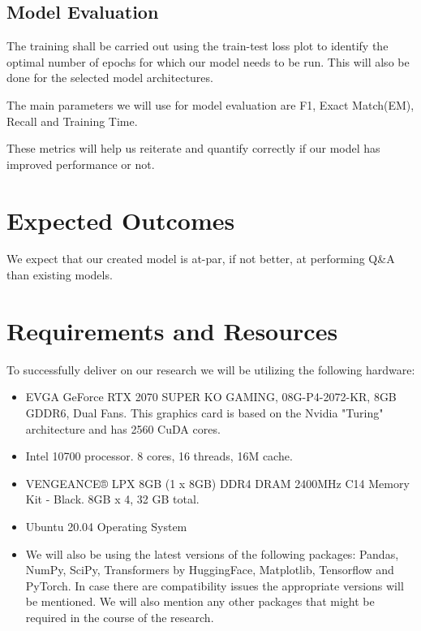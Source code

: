 \documentclass[12pt]{report}
\begin{document}
\begin{appendices}
        \subsection{Model Evaluation}
        The training shall be carried out using the train-test loss plot to identify the optimal number of epochs for which our model needs to be run. This will also be done for the selected model architectures.

        The main parameters we will use for model evaluation are F1, Exact Match(EM), Recall and Training Time.

        These metrics will help us reiterate and quantify correctly if our model has improved performance or not.

        \section{Expected Outcomes}\label{expectedoutcomes}

        We expect that our created model is at-par, if not better, at performing Q\&A than existing models.
        \section{Requirements and Resources}\label{resources}

        To successfully deliver on our research we will be utilizing the following hardware:
        \begin{itemize}
            \item EVGA GeForce RTX 2070 SUPER KO GAMING, 08G-P4-2072-KR, 8GB GDDR6, Dual Fans\citep{evga}. This graphics card is based on the Nvidia "Turing" architecture and has 2560 CuDA cores.
            \item Intel 10700 processor. 8 cores, 16 threads, 16M cache\citep{intel}.
            \item VENGEANCE® LPX 8GB (1 x 8GB) DDR4 DRAM 2400MHz C14 Memory Kit - Black\citep{Ram}. 8GB x 4, 32 GB total.
            \item Ubuntu 20.04 Operating System
            \item We will also be using the latest versions of the following packages: Pandas, NumPy, SciPy, Transformers by HuggingFace, Matplotlib, Tensorflow and PyTorch. In case there are compatibility issues the appropriate versions will be mentioned. We will also mention any other packages that might be required in the course of the research.
        \end{itemize}



\end{appendices}
\end{document}
